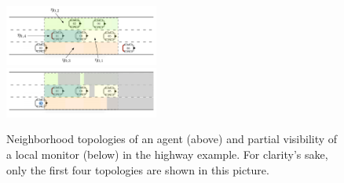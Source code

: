 \begin{figure}
\centering
\includegraphics[width=0.45\textwidth,clip]{images/highway-topology.pdf}\\
\includegraphics[width=0.45\textwidth,clip]{images/highway-visibility.pdf}\\
\caption{Neighborhood topologies of an agent (above) and partial visibility of a local monitor (below) in the highway example. {\color{red} For clarity's sake, only the first four topologies are shown in this picture.}}
\label{fig:car-neigh}
\end{figure}



